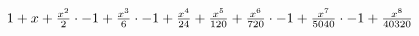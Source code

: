 \documentclass[32pt]{article}
\begin{document}
             
${{{{{{{{{1} + {x}} + {{{{x} ^ {2}} \over {2}} \cdot {-1}}} + {{{{x} ^ {3}} \over {6}} \cdot {-1}}} + {{{x} ^ {4}} \over {24}}} + {{{x} ^ {5}} \over {120}}} + {{{{x} ^ {6}} \over {720}} \cdot {-1}}} + {{{{x} ^ {7}} \over {5040}} \cdot {-1}}} + {{{x} ^ {8}} \over {40320}}}$
\end{document}
